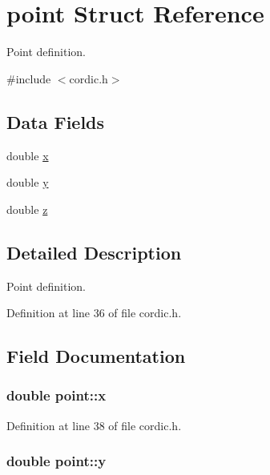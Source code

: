 \hypertarget{structpoint}{\section{point Struct Reference}
\label{structpoint}
}


Point definition.  




{\ttfamily \#include $<$cordic.\-h$>$}

\subsection*{Data Fields}
\begin{DoxyCompactItemize}
\item 
double \hyperlink{structpoint_a9c6b34deaf4900ad4193c17935fd384a}{x}
\item 
double \hyperlink{structpoint_a613f8f0d7352731638b0094e1b958b87}{y}
\item 
double \hyperlink{structpoint_aab1f0c3682401083b5bf252e7001874f}{z}
\end{DoxyCompactItemize}


\subsection{Detailed Description}
Point definition. 

Definition at line 36 of file cordic.\-h.



\subsection{Field Documentation}
\hypertarget{structpoint_a9c6b34deaf4900ad4193c17935fd384a}{
\subsubsection[{x}]{\setlength{\rightskip}{0pt plus 5cm}double point\-::x}}\label{structpoint_a9c6b34deaf4900ad4193c17935fd384a}


Definition at line 38 of file cordic.\-h.

\hypertarget{structpoint_a613f8f0d7352731638b0094e1b958b87}{
\subsubsection[{y}]{\setlength{\rightskip}{0pt plus 5cm}double point\-::y}}\label{structpoint_a613f8f0d7352731638b0094e1b958b87}


